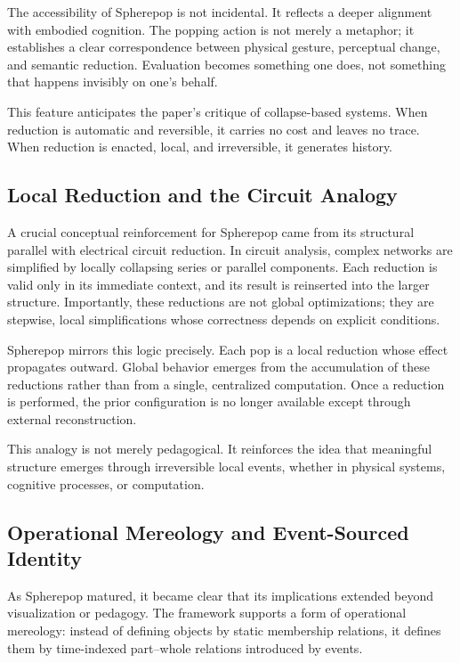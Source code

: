 \documentclass[11pt]{article}
\begin{document}
The accessibility of Spherepop is not incidental. It reflects a deeper alignment with embodied cognition. The popping action is not merely a metaphor; it establishes a clear correspondence between physical gesture, perceptual change, and semantic reduction. Evaluation becomes something one does, not something that happens invisibly on one’s behalf.

This feature anticipates the paper’s critique of collapse-based systems. When reduction is automatic and reversible, it carries no cost and leaves no trace. When reduction is enacted, local, and irreversible, it generates history.

\subsection{Local Reduction and the Circuit Analogy}

A crucial conceptual reinforcement for Spherepop came from its structural parallel with electrical circuit reduction. In circuit analysis, complex networks are simplified by locally collapsing series or parallel components. Each reduction is valid only in its immediate context, and its result is reinserted into the larger structure. Importantly, these reductions are not global optimizations; they are stepwise, local simplifications whose correctness depends on explicit conditions.

Spherepop mirrors this logic precisely. Each pop is a local reduction whose effect propagates outward. Global behavior emerges from the accumulation of these reductions rather than from a single, centralized computation. Once a reduction is performed, the prior configuration is no longer available except through external reconstruction.

This analogy is not merely pedagogical. It reinforces the idea that meaningful structure emerges through irreversible local events, whether in physical systems, cognitive processes, or computation.

\subsection{Operational Mereology and Event-Sourced Identity}

As Spherepop matured, it became clear that its implications extended beyond visualization or pedagogy. The framework supports a form of operational mereology: instead of defining objects by static membership relations, it defines them by time-indexed part–whole relations introduced by events.
\end{document}
